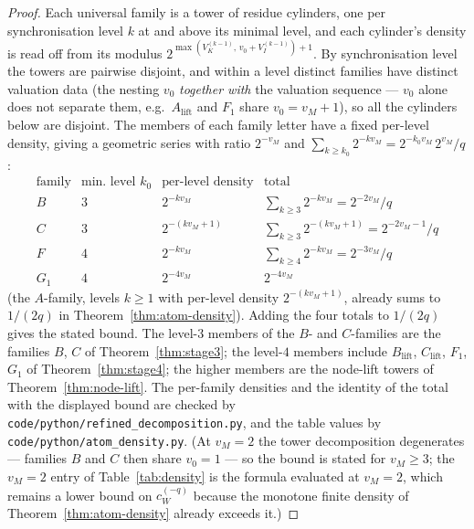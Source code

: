 \documentclass[11pt,reqno]{amsart}
\theoremstyle{plain}
\theoremstyle{definition}
\theoremstyle{remark}
\newcommand{\Vk}{V_{K}}
\newcommand{\Vi}{V_{I}}
\newcommand{\vM}{v_{M}}
\newcommand{\cWq}{c_{W}^{(-q)}}
\newcommand{\srcpath}[1]{\nolinkurl{#1}}
\begin{document}
\begin{proof}
Each universal family is a tower of residue cylinders, one per synchronisation
level $k$ at and above its minimal level, and each cylinder's density is read
off from its modulus $2^{\max(\Vk^{(k-1)},\, v_0 + \Vi^{(k-1)}) + 1}$. By
synchronisation level the towers are pairwise disjoint, and within a level
distinct families have distinct valuation data (the nesting $v_0$ \emph{together
with} the valuation sequence --- $v_0$ alone does not separate them, e.g.\
$A_{\mathrm{lift}}$ and $F_1$ share $v_0 = \vM + 1$), so all the cylinders below
are disjoint. The members of each family letter have a fixed per-level density,
giving a geometric series with ratio $2^{-\vM}$ and
$\sum_{k \ge k_0} 2^{-k\vM} = 2^{-k_0\vM}\,2^{\vM}/q$:
\[
\renewcommand{\arraystretch}{1.3}
\begin{array}{l|l|l|l}
\text{family} & \text{min.\ level } k_0 & \text{per-level density} & \text{total} \\ \hline
B & 3 & 2^{-k\vM} & \sum_{k\ge3} 2^{-k\vM} = 2^{-2\vM}/q \\
C & 3 & 2^{-(k\vM + 1)} & \sum_{k\ge3} 2^{-(k\vM+1)} = 2^{-2\vM - 1}/q \\
F & 4 & 2^{-k\vM} & \sum_{k\ge4} 2^{-k\vM} = 2^{-3\vM}/q \\
G_1 & 4 & 2^{-4\vM} & 2^{-4\vM}
\end{array}
\]
(the $A$-family, levels $k \ge 1$ with per-level density $2^{-(k\vM+1)}$, already
sums to $1/(2q)$ in Theorem~\ref{thm:atom-density}). Adding the four totals to
$1/(2q)$ gives the stated bound. The level-$3$ members of the $B$- and
$C$-families are the families $B$, $C$ of Theorem~\ref{thm:stage3}; the
level-$4$ members include $B_{\mathrm{lift}}$, $C_{\mathrm{lift}}$, $F_1$, $G_1$
of Theorem~\ref{thm:stage4}; the higher members are the node-lift towers of
Theorem~\ref{thm:node-lift}. The per-family densities and the identity of the
total with the displayed bound are checked by
\srcpath{code/python/refined\_decomposition.py}, and the table values by
\srcpath{code/python/atom\_density.py}. (At $\vM = 2$ the tower decomposition
degenerates --- families $B$ and $C$ then share $v_0 = 1$ --- so the bound is
stated for $\vM \ge 3$; the $\vM = 2$ entry of Table~\ref{tab:density} is the
formula evaluated at $\vM = 2$, which remains a lower bound on $\cWq$ because
the monotone finite density of Theorem~\ref{thm:atom-density} already exceeds
it.)
\end{proof}
\end{document}
